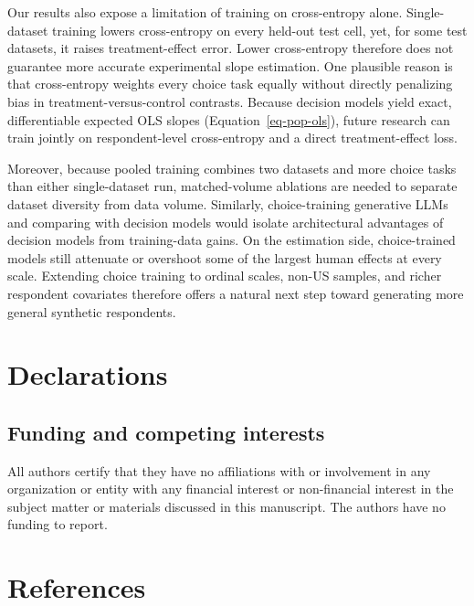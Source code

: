 \documentclass[
  11pt,
  letterpaper,
]{article}
\begin{document}
Our results also expose a limitation of training on cross-entropy alone.
Single-dataset training lowers cross-entropy on every held-out test
cell, yet, for some test datasets, it raises treatment-effect error.
Lower cross-entropy therefore does not guarantee more accurate
experimental slope estimation. One plausible reason is that
cross-entropy weights every choice task equally without directly
penalizing bias in treatment-versus-control contrasts. Because decision
models yield exact, differentiable expected OLS slopes
(Equation~\ref{eq-pop-ols}), future research can train jointly on
respondent-level cross-entropy and a direct treatment-effect loss.

Moreover, because pooled training combines two datasets and more choice
tasks than either single-dataset run, matched-volume ablations are
needed to separate dataset diversity from data volume. Similarly,
choice-training generative LLMs and comparing with decision models would
isolate architectural advantages of decision models from training-data
gains. On the estimation side, choice-trained models still attenuate or
overshoot some of the largest human effects at every scale. Extending
choice training to ordinal scales, non-US samples, and richer respondent
covariates therefore offers a natural next step toward generating more
general synthetic respondents.

\section*{Declarations}\label{declarations}

\subsection*{Funding and competing
interests}\label{funding-and-competing-interests}

All authors certify that they have no affiliations with or involvement
in any organization or entity with any financial interest or
non-financial interest in the subject matter or materials discussed in
this manuscript. The authors have no funding to report.

\section*{References}\label{references}
\end{document}
